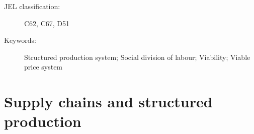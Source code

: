 \documentclass[11pt,fleqn]{article}
\begin{document}
\begin{singlespace}
	
\begin{abstract}
\noindent
This paper introduces a novel framework for analysing equilibrium in structured production systems that incorporate a static social division of labour, distinguishing between consumption goods traded in competitive markets and intermediate goods exchanged through bilateral relationships. We develop the concept of viability---the requirement that all producers earn positive incomes---as a foundational equilibrium prerequisite.

Our main theorem establishes that a structured production system is viable if and only if it is coherent---admitting no circular conversion processes that yield no net output---which in turn is equivalent to the non-singularity of its matrix representation. We further investigate completely viable systems, in which viable prices exist for all consumption good price vectors. We show that complete viability stands exactly between two input restrictions: it is guaranteed in coherent systems where no consumption good is used as an input in production, and it requires that no consumption good is used as an input in the production of another consumption good. The analysis thus reveals fundamental relationships between the architectural design of production systems and their economic sustainability.

Our framework also contributes to the literature on the existence of positive output price systems and the Hawkins-Simon condition in input-output analysis.
\end{abstract}

\medskip
\begin{description}
	\item[JEL classification:] C62, C67, D51
	\item[Keywords:] Structured production system; Social division of labour; Viability; Viable price system
\end{description}

\end{singlespace}

\thispagestyle{empty}

\newpage

\setcounter{page}{1} 

\section{Supply chains and structured production}
\end{document}
